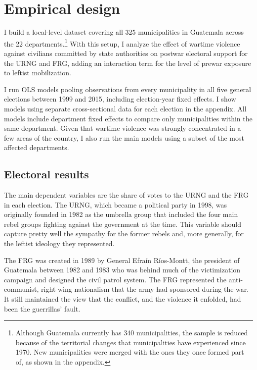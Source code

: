 \documentclass[12pt, notitlepage]{article}
\begin{document}
\section*{Empirical design}

I build a local-level dataset covering all 325 municipalities in Guatemala across the 22 departments.\footnote{Although Guatemala currently has 340 municipalities, the sample is reduced because of the territorial changes that municipalities have experienced since 1970. New municipalities were merged with the ones they once formed part of, as shown in the appendix.}
With this setup, I analyze the effect of wartime violence against civilians committed by state authorities on postwar electoral support for the URNG and FRG, adding an interaction term for the level of prewar exposure to leftist mobilization.

I run OLS models pooling observations from every municipality in all five general elections between 1999 and 2015, including election-year fixed effects.
I show models using separate cross-sectional data for each election in the appendix.
All models include department fixed effects to compare only municipalities within the same department.
Given that wartime violence was strongly concentrated in a few areas of the country, I also run the main models using a subset of the most affected departments.

\subsection*{Electoral results}

The main dependent variables are the share of votes to the URNG and the FRG in each election.
The URNG, which became a political party in 1998, was originally founded in 1982 as the umbrella group that included the four main rebel groups fighting against the government at the time.
This variable should capture pretty well the sympathy for the former rebels and, more generally, for the leftist ideology they represented.

The FRG was created in 1989 by General Efraín Ríos-Montt, the president of Guatemala between 1982 and 1983 who was behind much of the victimization campaign and designed the civil patrol system.
The FRG represented the anti-communist, right-wing nationalism that the army had sponsored during the war.
It still maintained the view that the conflict, and the violence it enfolded, had been the guerrillas' fault.
\end{document}
